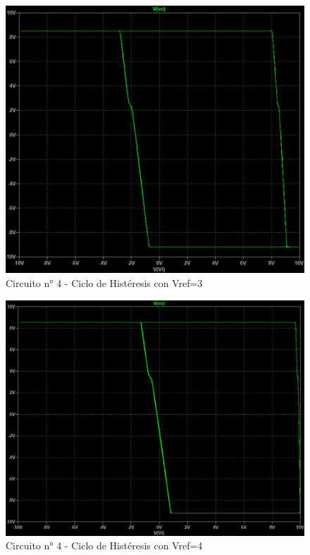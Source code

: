 \begin{figure}[H]
    \centering
    \includegraphics[width=1.0\linewidth]{Secciones/Circuito4/Circuito 4 - Vref3.png}
    \caption{Circuito n° 4 - Ciclo de Histéresis con Vref=3}
    \label{fig:Vref3}
\end{figure}

\begin{figure}[H]
    \centering
    \includegraphics[width=1.0\linewidth]{Secciones/Circuito4/Circuito 4 - Vref4.png}
    \caption{Circuito n° 4 - Ciclo de Histéresis con Vref=4}
    \label{fig:Vref4}
\end{figure}